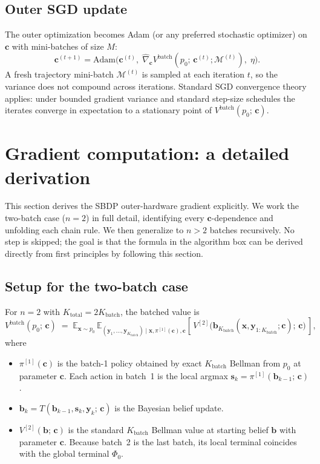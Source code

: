\documentclass[11pt,a4paper]{article}
\newcommand{\bc}{\bm{c}}
\newcommand{\bx}{\bm{x}}
\newcommand{\by}{\bm{y}}
\newcommand{\bs}{\bm{s}}
\newcommand{\bb}{\bm{b}}
\newcommand{\E}{\mathbb{E}}
\begin{document}
\subsection{Outer SGD update}

The outer optimization becomes Adam (or any preferred stochastic optimizer) on $\bc$ with
mini-batches of size $M$:
\begin{equation}
\bc^{(t+1)} = \mathrm{Adam}\bigl(\bc^{(t)},\; \widehat{\nabla}_{\bc} V^\mathrm{batch}(p_0;\, \bc^{(t)}; \mathcal{M}^{(t)}),\; \eta\bigr).
\end{equation}
A fresh trajectory mini-batch $\mathcal{M}^{(t)}$ is sampled at each iteration $t$, so the
variance does not compound across iterations.  Standard SGD convergence theory applies:
under bounded gradient variance and standard step-size schedules the iterates converge in
expectation to a stationary point of $V^\mathrm{batch}(p_0;\, \bc)$.

\section{Gradient computation: a detailed derivation}
\label{sec:gradient}

This section derives the SBDP outer-hardware gradient explicitly.  We work the two-batch
case ($n = 2$) in full detail, identifying every $\bc$-dependence and unfolding each chain
rule.  We then generalize to $n > 2$ batches recursively.  No step is skipped; the goal is
that the formula in the algorithm box can be derived directly from first principles by
following this section.

\subsection{Setup for the two-batch case}
\label{sec:n2_setup}

For $n = 2$ with $K_\mathrm{total} = 2 K_\mathrm{batch}$, the batched value is
\begin{equation}
V^\mathrm{batch}(p_0;\, \bc)
\;=\;
\E_{\bx \sim p_0}\,
\E_{(\by_1, \ldots, \by_{K_\mathrm{batch}}) \mid \bx, \pi^{[1]}(\bc), \bc}
\!\left[\,
V^{[2]}\bigl(\bb_{K_\mathrm{batch}}(\bx, \by_{1:K_\mathrm{batch}}; \bc);\, \bc\bigr)
\,\right],
\label{eq:Vbatch_n2}
\end{equation}
where
\begin{itemize}[nosep,leftmargin=2em]
\item $\pi^{[1]}(\bc)$ is the batch-1 policy obtained by exact $K_\mathrm{batch}$ Bellman
      from $p_0$ at parameter $\bc$.  Each action in batch~1 is the local argmax
      $\bs_k = \pi^{[1]}(\bb_{k-1};\, \bc)$.
\item $\bb_{k} = T(\bb_{k-1}, \bs_k, \by_k;\, \bc)$ is the Bayesian belief update.
\item $V^{[2]}(\bb;\, \bc)$ is the standard $K_\mathrm{batch}$ Bellman value at starting
      belief $\bb$ with parameter $\bc$.  Because batch~2 is the last batch, its local
      terminal coincides with the global terminal $\Phi_0$.
\end{itemize}
\end{document}
